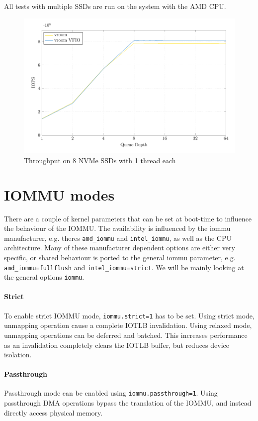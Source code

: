 All tests with multiple SSDs are run on the system with the AMD CPU.

\begin{figure}[H]
  \centering
  \includegraphics[width=\textwidth]{figures/qdnt1_2MiB_8nvmes}
  \caption{Throughput on 8 NVMe SSDs with 1 thread each}
  \label{fig:8nvmes}
\end{figure}

\section{IOMMU modes}
There are a couple of kernel parameters that can be set at boot-time to influence the behaviour of the IOMMU. The availability is influenced by the iommu manufacturer, e.g. theres \texttt{amd\_iommu} and \texttt{intel\_iommu}, as well as the CPU architecture. Many of these manufacturer dependent options are either very specific, or shared behaviour is ported to the general iommu parameter, e.g. \texttt{amd\_iommu=fullflush} and \texttt{intel\_iommu=strict}. We will be mainly looking at the general options \texttt{iommu}.

\paragraph{Strict}
To enable strict IOMMU mode, \texttt{iommu.strict=1} has to be set. Using strict mode, unmapping operation cause a complete IOTLB invalidation. Using relaxed mode, unmapping operations can be deferred and batched. This increases performance as an invalidation completely clears the IOTLB buffer, but reduces device isolation.

\paragraph{Passthrough}
Passthrough mode can be enabled using \texttt{iommu.passthrough=1}. Using passthrough DMA operations bypass the translation of the IOMMU, and instead directly access physical memory.